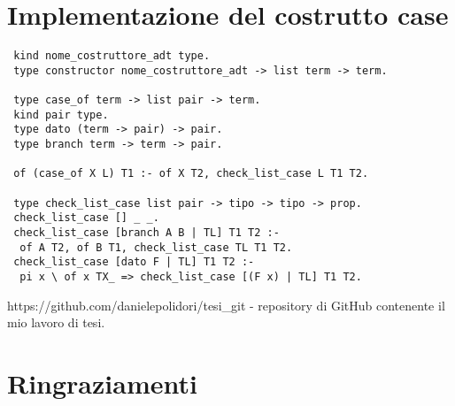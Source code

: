 \documentclass[12pt,a4paper,openright,twoside]{report}
\begin{document}
\chapter{Implementazione del costrutto case}   %
\begin{verbatim}
 kind nome_costruttore_adt type.
 type constructor nome_costruttore_adt -> list term -> term.

 type case_of term -> list pair -> term.
 kind pair type.
 type dato (term -> pair) -> pair.
 type branch term -> term -> pair.

 of (case_of X L) T1 :- of X T2, check_list_case L T1 T2.

 type check_list_case list pair -> tipo -> tipo -> prop.
 check_list_case [] _ _.
 check_list_case [branch A B | TL] T1 T2 :-
  of A T2, of B T1, check_list_case TL T1 T2.
 check_list_case [dato F | TL] T1 T2 :-
  pi x \ of x TX_ => check_list_case [(F x) | TL] T1 T2.
\end{verbatim}

\clearpage{\pagestyle{empty}\cleardoublepage}		%





\begin{thebibliography}{90}		%


 https://github.com/danielepolidori/tesi_git - repository di GitHub contenente il mio lavoro di tesi.

\end{thebibliography}

\clearpage{\pagestyle{empty}\cleardoublepage}	%


\chapter*{Ringraziamenti}

\thispagestyle{empty}

\end{document}
